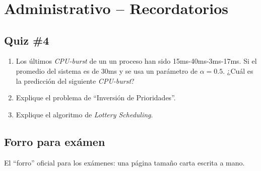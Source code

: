 \documentclass[12pt, times]{simauth}
\begin{document}

\title{
    { \fontsize{30}{1} \selectfont{
        SOA: Apuntes 13 de Marzo 2017 }
    }
}

\author{
    { \fontsize{14}{1} \selectfont{
        Carlos Martín Flores González \\
        Carné: 2015183528}
    }
}

%



\maketitle

\tableofcontents

\section{Administrativo -- Recordatorios}

\subsection{Quiz \#4}
\begin{enumerate}
    \item Los últimos \emph{CPU-burst} de un un proceso han sido 15ms-40ms-3ms-17ms. Si el promedio del sistema es de 30ms y se usa un parámetro de $\alpha = 0.5$. ¿Cuál es la predicción del siguiente \emph{CPU-burst}?
    \item Explique el problema de ``Inversión de Prioridades''.
    \item Explique el algoritmo de \emph{Lottery Scheduling}.
\end{enumerate}

\subsection{Forro para exámen}
El ``forro'' oficial para los exámenes: una página tamaño carta escrita a mano. 
\end{document}
